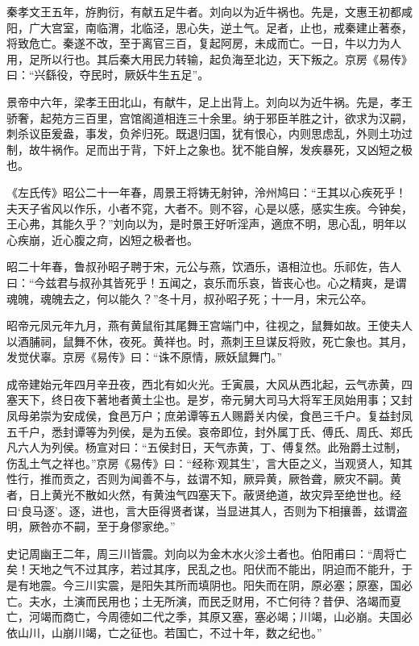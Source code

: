 \documentclass[12pt,UTF8]{ctexbook}
\begin{document}
秦孝文王五年，斿朐衍，有献五足牛者。刘向以为近牛祸也。先是，文惠王初都咸阳，广大宫室，南临渭，北临泾，思心失，逆土气。足者，止也，戒秦建止著泰，将致危亡。秦遂不改，至于离官三百，复起阿房，未成而亡。一日，牛以力为人用，足所以行也。其后秦大用民力转输，起负海至北边，天下叛之。京房《易传》曰：“兴繇役，夺民时，厥妖牛生五足”。



景帝中六年，梁孝王田北山，有献牛，足上出背上。刘向以为近牛祸。先是，孝王骄奢，起苑方三百里，宫馆阁道相连三十余里。纳于邪臣羊胜之计，欲求为汉嗣，刺杀议臣爰盎，事发，负斧归死。既退归国，犹有恨心，内则思虑乱，外则土功过制，故牛祸作。足而出于背，下奸上之象也。犹不能自解，发疾暴死，又凶短之极也。



《左氏传》昭公二十一年春，周景王将铸无射钟，泠州鸠曰：“王其以心疾死乎！夫天子省风以作乐，小者不窕，大者不。则不容，心是以感，感实生疾。今钟矣，王心弗，其能久乎？”刘向以为，是时景王好听淫声，適庶不明，思心乱，明年以心疾崩，近心腹之疴，凶短之极者也。



昭二十年春，鲁叔孙昭子聘于宋，元公与燕，饮酒乐，语相泣也。乐祁佐，告人曰：“今兹君与叔孙其皆死乎！五闻之，哀乐而乐哀，皆丧心也。心之精爽，是谓魂魄，魂魄去之，何以能久？”冬十月，叔孙昭子死；十一月，宋元公卒。



昭帝元凤元年九月，燕有黄鼠衔其尾舞王宫端门中，往视之，鼠舞如故。王使夫人以酒脯祠，鼠舞不休，夜死。黄祥也。时，燕刺王旦谋反将败，死亡象也。其月，发觉伏辜。京房《易传》曰：“诛不原情，厥妖鼠舞门。”



成帝建始元年四月辛丑夜，西北有如火光。壬寅晨，大风从西北起，云气赤黄，四塞天下，终日夜下著地者黄土尘也。是岁，帝元舅大司马大将军王凤始用事；又封凤母弟崇为安成侯，食邑万户；庶弟谭等五人赐爵关内侯，食邑三千户。复益封凤五千户，悉封谭等为列侯，是为五侯。哀帝即位，封外属丁氏、傅氏、周氏、郑氏凡六人为列侯。杨宣对曰：“五侯封日，天气赤黄，丁、傅复然。此殆爵土过制，伤乱土气之祥也。”京房《易传》曰：“经称‘观其生’，言大臣之义，当观贤人，知其性行，推而贡之，否则为闻善不与，兹谓不知，厥异黄，厥咎聋，厥灾不嗣。黄者，日上黄光不散如火然，有黄浊气四塞天下。蔽贤绝道，故灾异至绝世也。经曰‘良马逐’。逐，进也，言大臣得贤者谋，当显进其人，否则为下相攘善，兹谓盗明，厥咎亦不嗣，至于身僇家绝。”



史记周幽王二年，周三川皆震。刘向以为金木水火沴土者也。伯阳甫曰：“周将亡矣！天地之气不过其序，若过其序，民乱之也。阳伏而不能出，阴迫而不能升，于是有地震。今三川实震，是阳失其所而填阴也。阳失而在阴，原必塞；原塞，国必亡。夫水，土演而民用也；土无所演，而民乏财用，不亡何待？昔伊、洛竭而夏亡，河竭而商亡，今周德如二代之季，其原又塞，塞必竭；川竭，山必崩。夫国必依山川，山崩川竭，亡之征也。若国亡，不过十年，数之纪也。”
\end{document}
